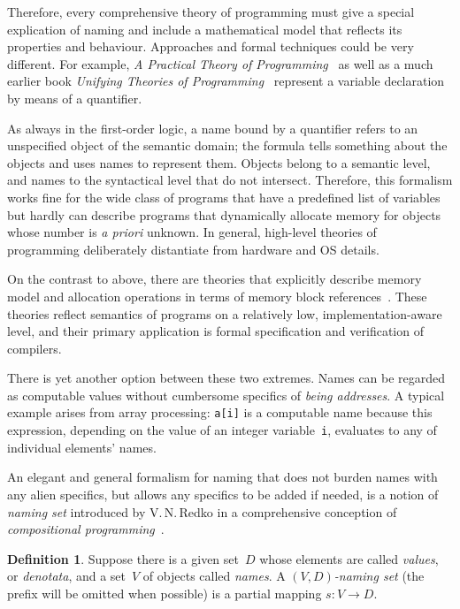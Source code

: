 \documentclass{article}
\theoremstyle{definition}
\newtheorem{Df}{Definition}
\begin{document}
Therefore, every comprehensive theory of programming must give a special
explication of naming and include a mathematical model that reflects its
properties and behaviour.  Approaches and formal techniques could be very
different.  For example, \emph{A Practical Theory of
Programming}~\cite{bib:ptop} as well as a much earlier book \emph{Unifying
Theories of Programming}~\cite{bib:utp} represent a variable declaration by
means of a quantifier.

As always in the first-order logic, a name bound by a quantifier refers to an
unspecified object of the semantic domain; the formula tells something about
the objects and uses names to represent them.  Objects belong to a semantic
level, and names to the syntactical level that do not intersect.  Therefore,
this formalism works fine for the wide class of programs that have a predefined
list of variables but hardly can describe programs that dynamically allocate
memory for objects whose number is \emph{a priori} unknown.  In general,
high-level theories of programming deliberately distantiate from hardware and
OS details.

On the contrast to above, there are theories that explicitly describe memory
model and allocation operations in terms of memory block
references~\cite{bib:leroy}.  These theories reflect semantics of programs on a
relatively low, implementation-aware level, and their primary application is
formal specification and verification of compilers.

There is yet another option between these two extremes.  Names can be regarded
as computable values without cumbersome specifics of \emph{being addresses}.  A
typical example arises from array processing: \lstinline{a[i]} is a computable
name because this expression, depending on the value of an integer
variable~\lstinline{i}, evaluates to any of individual elements' names.

An elegant and general formalism for naming that does not burden names
with any alien specifics, but allows any specifics to be added if needed,
is a notion of \emph{naming set} introduced by V.\,N.\,Redko in a
comprehensive conception of \emph{compositional programming}~\cite{bib:redko}.

\begin{Df}\label{df:naming-set}
Suppose there is a given set~$D$ whose elements are called \emph{values}, or
\emph{denotata}, and a set~$V$ of objects called \emph{names}.
A \emph{$(V,D)$-naming set} (the prefix will be omitted when possible) is a
partial mapping $s: V\to D$.
\end{Df}
\end{document}

